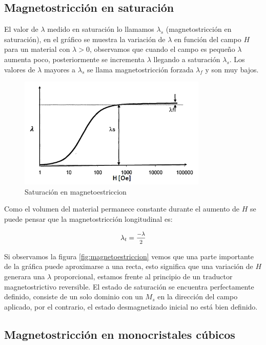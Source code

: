 \subsection{Magnetostricción en saturación}

El valor de $\lambda$ medido en saturación lo llamamos $\lambda_{s}$ (magnetostricción en saturación), en el gráfico se muestra la variación de $\lambda$ en función del campo $H$ para un material con $\lambda> 0$, observamos que cuando el campo es pequeño $\lambda$ aumenta poco, posteriormente se incrementa $\lambda$ llegando a saturación $\lambda_{s}$. Los valores de $\lambda$ mayores a $\lambda_{s}$ se llama magnetostricción forzada $\lambda_{f}$ y son muy bajos.

\begin{figure}[H]
    \centering
    \includegraphics[width=0.8\textwidth]{./Figures/magnetoestriccion}
	\caption{Saturación en magnetoestriccion}
	\label{fig:magnetoestriccion_2}
\end{figure}

Como el volumen del material permanece constante durante el aumento de $H$ se puede pensar que la magnetostricción longitudinal es:

\begin{equation}
	\lambda_{t} = \mfrac{-\lambda}{2}
\end{equation}

Si observamos la figura \ref{fig:magnetoestriccion} vemos que una parte importante de la gráfica puede aproximarse a una recta, esto significa que una variación de $H$ generara una $\lambda$ proporcional, estamos frente al principio de un traductor magnetostrictivo reversible. El estado de saturación se encuentra perfectamente definido, consiste de un solo dominio con un $M_{s}$ en la dirección del campo aplicado, por el contrario, el estado desmagnetizado inicial no está bien definido.

\subsection{Magnetostricción en monocristales cúbicos}

